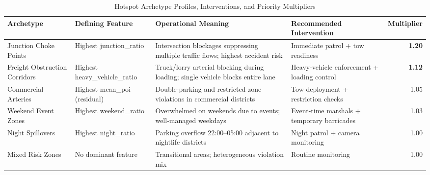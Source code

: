 \documentclass[12pt,a4paper]{article}
\begin{document}
\begin{table}[htbp]
\centering
\caption{Hotspot Archetype Profiles, Interventions, and Priority Multipliers}
\label{tab:archetypes}
\small
\begin{tabularx}{\textwidth}{@{}lXXXr@{}}
\toprule
\textbf{Archetype} & \textbf{Defining Feature} & \textbf{Operational Meaning} & \textbf{Recommended Intervention} & \textbf{Multiplier}\\
\midrule
Junction Choke Points        & Highest junction\_ratio   & Intersection blockages suppressing multiple traffic flows; highest accident risk & Immediate patrol + tow readiness & \textbf{1.20}\\
\addlinespace
Freight Obstruction Corridors& Highest heavy\_vehicle\_ratio & Truck/lorry arterial blocking during loading; single vehicle blocks entire lane & Heavy-vehicle enforcement + loading control & \textbf{1.12}\\
\addlinespace
Commercial Arteries          & Highest mean\_poi (residual) & Double-parking and restricted zone violations in commercial districts & Tow deployment + restriction checks & 1.05\\
\addlinespace
Weekend Event Zones          & Highest weekend\_ratio    & Overwhelmed on weekends due to events; well-managed weekdays & Event-time marshals + temporary barricades & 1.03\\
\addlinespace
Night Spillovers             & Highest night\_ratio      & Parking overflow 22:00--05:00 adjacent to nightlife districts & Night patrol + camera monitoring & 1.00\\
\addlinespace
Mixed Risk Zones             & No dominant feature       & Transitional areas; heterogeneous violation mix & Routine monitoring & 1.00\\
\bottomrule
\end{tabularx}
\end{table}
\end{document}
